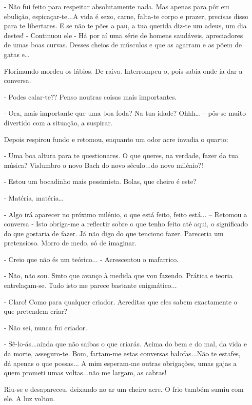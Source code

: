 - Não fui feito para respeitar absolutamente nada. Mas apenas para pôr
em ebulição, espicaçar-te...A vida é sexo, carne, falta-te corpo e
prazer, precisas disso para te libertares. E se não te pões a pau, a tua
querida diz-te um adeus, um dia destes! - Continuou ele - Há por aí uma
série de homens saudáveis, apreciadores de umas boas curvas. Desses
cheios de músculos e que as agarram e as põem de gatas e\ldots{}

Florimundo mordeu os lábios. De raiva. Interrompeu-o, pois sabia onde ia
dar a conversa.

- Podes calar-te?? Penso noutras coisas mais importantes.

- Ora, mais importante que uma boa foda? Na tua idade? Ohhh\ldots{} --
pôs-se muito divertido com a situação, a suspirar.

Depois respirou fundo e retomou, enquanto um odor acre invadia o quarto:

- Uma boa altura para te questionares. O que queres, na verdade, fazer
da tua música? Vislumbro o novo Bach do novo século...do novo milénio?!

- Estou um bocadinho mais pessimista. Bolas, que cheiro é este?

- Matéria, matéria\ldots{}

- Algo irá aparecer no próximo milénio, o que está feito, feito está...
-- Retomou a conversa - Isto obriga-me a reflectir sobre o que tenho
feito até aqui, o significado do que gostaria de fazer. Já não digo do
que tenciono fazer. Pareceria um pretensioso. Morro de medo, só de
imaginar.

- Creio que não és um teórico... - Acrescentou o mafarrico.

- Não, não sou. Sinto que avanço à medida que vou fazendo. Prática e
teoria entrelaçam-se. Tudo isto me parece bastante enigmático...

- Claro! Como para qualquer criador. Acreditas que eles sabem
exactamente o que pretendem criar?

- Não sei, nunca fui criador.

- Sê-lo-ás...ainda que não saibas o que criarás. Acima do bem e do mal,
da vida e da morte, asseguro-te. Bom, fartam-me estas conversas
balofas...Não te estafes, dá apenas o que possas... A mim esperam-me
outras obrigações, umas gajas a quem prometi umas voltas...não me
largam, as cabras!

Riu-se e desapareceu, deixando no ar um cheiro acre. O frio também sumiu
com ele. A luz voltou.

